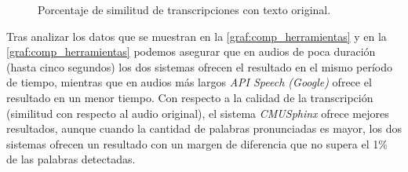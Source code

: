 \documentclass[../main.tex]{subfiles}
\begin{document}
\begin{figure}[H]
  \begin{center}
        \caption{Porcentaje de similitud de transcripciones con texto original.}
        \label{graf:comp_similitud}
    \end{center}
\end{figure}

Tras analizar los datos que se muestran en la \autoref{graf:comp_herramientas} y en la \autoref{graf:comp_herramientas} podemos asegurar que en audios de poca duración (hasta cinco segundos) los dos sistemas ofrecen el resultado en el mismo período de tiempo, mientras que en audios más largos \textit{API Speech (Google)} ofrece el resultado en un menor tiempo. Con respecto a la calidad de la transcripción (similitud con respecto al audio original), el sistema \textit{CMUSphinx} ofrece mejores resultados, aunque cuando la cantidad de palabras pronunciadas es mayor, los dos sistemas ofrecen un resultado con un margen de diferencia que no supera el 1\% de las palabras detectadas.
\end{document}

